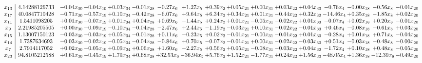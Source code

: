 \documentclass[9pt]{article}
\begin{document}
 \[\begin{array}{c| c c@{\hskip 2pt} c@{\hskip 2pt} c@{\hskip 2pt} c@{\hskip 2pt} c@{\hskip 2pt} c@{\hskip 2pt} c@{\hskip 2pt} c@{\hskip 2pt} c@{\hskip 2pt} c@{\hskip 2pt} c@{\hskip 2pt} c@{\hskip 2pt} c@{\hskip 2pt} c@{\hskip 2pt} c@{\hskip 2pt} }
 x_{13}   &  4.14288126733 & -0.04 x_{30} & +  0.04 x_{19} & +  0.03 x_{34} & -0.01 x_{28} & -0.27 x_{6} & +  1.27 x_{5} & +  0.39 x_{2} & +  0.05 x_{21} & +  0.00 x_{31} & +  0.03 x_{22} & +  0.04 x_{33} & -0.76 x_{4} & -0.00 x_{18} & -0.56 x_{8} & -0.01 x_{20}\\
 x_{17}   &  40.0847710428 & -0.71 x_{30} & +  0.57 x_{19} & +  0.10 x_{34} & -0.42 x_{28} & -6.07 x_{6} & +  9.64 x_{5} & +  6.34 x_{2} & +  0.34 x_{21} & +  0.01 x_{31} & -0.44 x_{22} & +  0.32 x_{33} & -14.46 x_{4} & +  0.35 x_{18} & -1.85 x_{8} & +  0.02 x_{20}\\
 x_{11}   &  1.5411098205 & +  0.01 x_{30} & -0.07 x_{19} & +  0.01 x_{34} & +  0.04 x_{28} & +  0.69 x_{6} & -1.44 x_{5} & +  0.24 x_{2} & +  0.01 x_{21} & -0.05 x_{31} & -0.02 x_{22} & +  0.01 x_{33} & -0.07 x_{4} & +  0.02 x_{18} & +  0.20 x_{8} & -0.01 x_{20}\\
 x_{9}   &  2.21985205505 & +  0.00 x_{30} & +  0.09 x_{19} & -0.10 x_{34} & -0.04 x_{28} & -2.47 x_{6} & +  2.44 x_{5} & -1.19 x_{2} & -0.03 x_{21} & +  0.10 x_{31} & -0.02 x_{22} & -0.01 x_{33} & +  0.46 x_{4} & -0.08 x_{18} & -0.61 x_{8} & +  0.03 x_{20}\\
 x_{15}   &  1.13007150123 & -0.03 x_{30} & -0.03 x_{19} & +  0.05 x_{34} & -0.01 x_{28} & +  0.11 x_{6} & -0.23 x_{5} & +  0.02 x_{2} & -0.01 x_{21} & -0.00 x_{31} & -0.01 x_{22} & +  0.01 x_{33} & -0.28 x_{4} & +  0.01 x_{18} & +  0.71 x_{8} & -0.04 x_{20}\\
 x_{14}   &  1.7387634693 & -0.03 x_{30} & +  0.02 x_{19} & -0.05 x_{34} & -0.04 x_{28} & -0.84 x_{6} & +  0.70 x_{5} & -0.07 x_{2} & -0.01 x_{21} & +  0.00 x_{31} & -0.02 x_{22} & -0.03 x_{33} & +  0.51 x_{4} & -0.03 x_{18} & -0.48 x_{8} & -0.00 x_{20}\\
 x_{7}   &  2.7914117052 & +  0.02 x_{30} & -0.05 x_{19} & +  0.09 x_{34} & +  0.06 x_{28} & +  1.60 x_{6} & -2.27 x_{5} & +  0.56 x_{2} & +  0.05 x_{21} & -0.08 x_{31} & -0.03 x_{22} & +  0.04 x_{33} & -1.72 x_{4} & +  0.10 x_{18} & +  0.48 x_{8} & -0.05 x_{20}\\
 x_{23}   &  94.8105212588 & +  0.61 x_{30} & -0.45 x_{19} & +  1.79 x_{34} & +  0.68 x_{28} & + 32.53 x_{6} & -36.94 x_{5} & +  5.76 x_{2} & +  1.52 x_{21} & -1.77 x_{31} & +  0.24 x_{22} & +  1.56 x_{33} & -48.05 x_{4} & +  1.36 x_{18} & -12.39 x_{8} & -0.49 x_{20}\\

\end{array}\]
\end{document}
